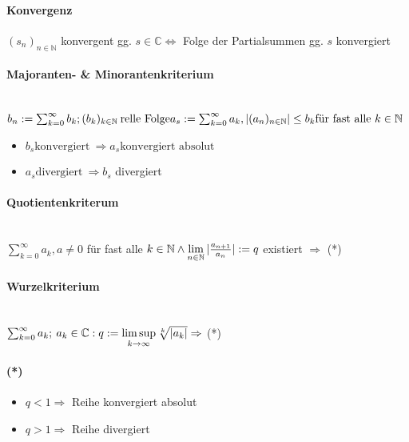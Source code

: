 \documentclass[paper=a3,paper=landscape, fontsize=9pt,DIV=25]{scrartcl}
\newcommand{\compl}{\mathbb{C}}
\newcommand{\nat}{\mathbb{N}}
\newcommand{\aseq}{(a_n)_{n \in \nat}}
\newcommand{\srow}{(s_n)_{n \in \nat}}
\begin{document}
\begin{multicols*}{4}
  \paragraph{Konvergenz}
  $\srow$ konvergent gg. $s \in \compl \Leftrightarrow$ Folge der Partialsummen gg. $s$ konvergiert


  \paragraph{Majoranten- \& Minorantenkriterium}\hspace{0pt} \\
  $ b_n := \sum_{k=0}^{\infty} b_k; (b_k)_{k \in \nat}\:\text{relle Folge}\\ a_s := \sum_{k=0}^{\infty} a_k, |\aseq| \leq b_k \text{für fast alle}\ k \in \nat$
  \begin{itemize}
  \item $b_s \text{konvergiert}\ \Rightarrow a_s \text{konvergiert absolut}$
  \item $a_s \text{divergiert}\ \Rightarrow b_s$ divergiert
  \end{itemize}


  \paragraph{Quotientenkriterum}\hspace{0pt} \\
  $ \sum_{k=0}^{\infty} a_k, a \neq 0$ für fast alle $k \in \nat \wedge \lim\limits_{n \in \nat} \arrowvert \frac{a_{n+1}}{a_n} \arrowvert := q$ existiert $\Rightarrow$ (*)


  \paragraph{Wurzelkriterium}\hspace{0pt} \\
  $ \sum_{k=0}^{\infty} a_k;\:a_k \in \compl: q := \limsup\limits_{k \rightarrow \infty} \sqrt[k]{\arrowvert a_k \arrowvert} \Rightarrow$ (*)


  \paragraph{(*)}
  \begin{itemize}
  \item $q < 1 \Rightarrow$ Reihe konvergiert absolut
  \item $q > 1 \Rightarrow$ Reihe divergiert
  \end{itemize}



\end{multicols*}
\end{document}
